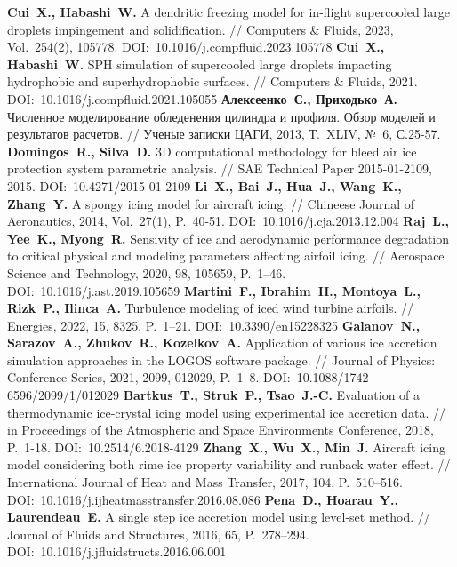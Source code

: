 \begin{thebibliography}{99}
%
\textbf{Cui~X., Habashi~W.} A dendritic freezing model for in-flight supercooled large droplets impingement and solidification. // Computers \& Fluids, 2023, Vol.~254(2), 105778. DOI:~10.1016/j.compfluid.2023.105778
%
\textbf{Cui~X., Habashi~W.} SPH simulation of supercooled large droplets impacting hydrophobic and superhydrophobic surfaces. // Computers \& Fluids, 2021. DOI:~10.1016/j.compfluid.2021.105055
%
\textbf{Алексеенко~С., Приходько~А.} Численное моделирование обледенения цилиндра и профиля. Обзор моделей и результатов расчетов. // Ученые записки ЦАГИ, 2013, Т.~XLIV, №~6, С.25-57.
%
\textbf{Domingos~R., Silva~D.} 3D computational methodology for bleed air ice protection system parametric analysis. // SAE Technical Paper 2015-01-2109, 2015. DOI:~10.4271/2015-01-2109
%
\textbf{Li~X., Bai~J., Hua~J., Wang~K., Zhang~Y.} A spongy icing model for aircraft icing. // Chineese Journal of Aeronautics, 2014, Vol.~27(1), P.~40-51. DOI:~10.1016/j.cja.2013.12.004
%
\textbf{Raj~L., Yee~K., Myong~R.} Sensivity of ice and aerodynamic performance degradation to critical physical and modeling parameters affecting airfoil icing. // Aerospace Science and Technology, 2020, 98, 105659, P.~1–46. DOI:~10.1016/j.ast.2019.105659
%
\textbf{Martini~F., Ibrahim~H., Montoya~L., Rizk~P., Ilinca~A.} Turbulence modeling of iced wind turbine airfoils. // Energies, 2022, 15, 8325, P.~1–21. DOI:~10.3390/en15228325
%
\textbf{Galanov~N., Sarazov~A., Zhukov~R., Kozelkov~A.} Application of various ice accretion simulation approaches in the LOGOS software package. // Journal of Physics: Conference Series, 2021, 2099, 012029, P.~1–8. DOI:~10.1088/1742-6596/2099/1/012029
%
\textbf{Bartkus~T., Struk~P., Tsao~J.-C.} Evaluation of a thermodynamic ice-crystal icing model using experimental ice accretion data. // in Proceedings of the Atmospheric and Space Environments Conference, 2018, P.~1-18. DOI:~10.2514/6.2018-4129
%
\textbf{Zhang~X., Wu~X., Min~J.} Aircraft icing model considering both rime ice property variability and runback water effect. // International Journal of Heat and Mass Transfer, 2017, 104, P.~510–516. DOI:~10.1016/j.ijheatmasstransfer.2016.08.086
%
\textbf{Pena~D., Hoarau~Y., Laurendeau~E.} A single step ice accretion model using level-set method. // Journal of Fluids and Structures, 2016, 65, P.~278–294. DOI:~10.1016/j.jfluidstructs.2016.06.001

\end{thebibliography}
